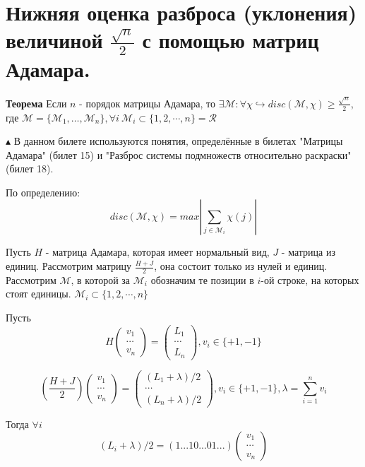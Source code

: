 \setcounter{section}{86}
\section{Нижняя оценка разброса (уклонения) величиной $\frac{\sqrt{n}}{2}$ с помощью матриц Адамара.}

\textbf{Теорема} Если $n$ - порядок матрицы Адамара, то $\exists \mathcal{M}: \forall \chi \hookrightarrow disc(\mathcal{M}, \chi) \geq \frac{\sqrt{n}}{2}$, где $\mathcal{M} = \{\mathcal{M}_1, \ldots, \mathcal{M}_n\}, \forall i \ \mathcal{M}_i \subset \{1, 2, \cdots, n\} = \mathcal{R}$

$\blacktriangle$
В данном билете используются понятия, определённые в билетах "Матрицы Адамара" (билет 15) и "Разброс системы подмножеств относительно раскраски" (билет 18).

По определению:
$$disc(\mathcal{M}, \chi) = max|\sum_{j \in \mathcal{M}_i} \chi(j)|$$

Пусть $H$ - матрица Адамара, которая имеет нормальный вид, $J$ - матрица из единиц. Рассмотрим матрицу $\frac{H + J}{2}$, она состоит только из нулей и единиц. Рассмотрим $\mathcal{M}$, в которой за $\mathcal{M}_i$ обозначим те позиции в $i$-ой строке, на которых стоят единицы. $\mathcal{M}_i \subset \{1, 2, \cdots, n\} $

Пусть
$$
H
\begin{pmatrix} 
v_1 \\ 
\cdots \\
v_n
\end{pmatrix}
=
\begin{pmatrix} 
L_1 \\ 
\cdots \\
L_n
\end{pmatrix},
v_i \in \{+1, -1\}
$$

$$
\left(\frac{H + J}{2}\right)
\begin{pmatrix} 
v_1 \\ 
\cdots \\
v_n
\end{pmatrix}
=
\begin{pmatrix} 
(L_1 + \lambda) / 2 \\ 
\cdots \\
(L_n + \lambda) / 2
\end{pmatrix},
v_i \in \{+1, -1\}, \lambda = \sum_{i = 1}^n v_i 
$$

Тогда $\forall i$
$$(L_i + \lambda) / 2 = 
(1...10...01...) 
\begin{pmatrix} 
v_1 \\ 
\cdots \\
v_n
\end{pmatrix}
$$

